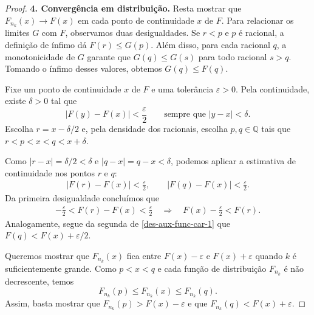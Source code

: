 \documentclass[12pt,portuguese]{article}
\theoremstyle{definition}
\theoremstyle{plainexercise}
\theoremstyle{starredexercise}
\theoremstyle{definition}
\begin{document}
\begin{proof}
\bigskip

\noindent\textbf{4. Convergência em distribuição.}
Resta mostrar que $F_{n_k}(x)\to F(x)$ em cada ponto de continuidade $x$ de
$F$. Para relacionar os limites $G$ com $F$, observamos duas desigualdades.
Se $r<p$ e $p$ é racional, a definição de ínfimo dá $F(r)\leqslant G(p)$.
Além disso, para cada racional $q$, a monotonicidade de $G$ garante que
$G(q)\leqslant G(s)$ para todo racional $s>q$. Tomando o ínfimo desses
valores, obtemos $G(q)\leqslant F(q)$.

Fixe um ponto de continuidade $x$ de $F$ e uma tolerância $\varepsilon>0$.
Pela continuidade, existe $\delta>0$ tal que
\[
|F(y)-F(x)|<\frac{\varepsilon}{2}
\qquad\text{sempre que }|y-x|<\delta.
\]
Escolha $r=x-\delta/2$ e, pela densidade dos racionais, escolha
$p,q\in\mathbb{Q}$ tais que $r<p<x<q<x+\delta$.

\begin{center}
\end{center}
Como $|r-x|=\delta/2<\delta$ e $|q-x|=q-x<\delta$, podemos aplicar a
estimativa de continuidade nos pontos $r$ e $q$:
\begin{align}\label{des-aux-func-car-1}
|F(r)-F(x)|<\frac{\varepsilon}{2},
\qquad
|F(q)-F(x)|<\frac{\varepsilon}{2}.
\end{align}
Da primeira desigualdade concluímos que
\begin{align*}
-\frac{\varepsilon}{2} < F(r)-F(x) <\frac{\varepsilon}{2}
\quad \Longrightarrow \quad
F(x)-\frac{\varepsilon}{2}<F(r).
\end{align*}
Analogamente, segue da segunda de \eqref{des-aux-func-car-1} que
$F(q)<F(x)+\varepsilon/2$.

Queremos mostrar que $F_{n_k}(x)$ fica entre $F(x)-\varepsilon$ e
$F(x)+\varepsilon$ quando $k$ é suficientemente grande. Como $p<x<q$ e
cada função de distribuição $F_{n_k}$ é não decrescente, temos
\[
F_{n_k}(p)\leqslant F_{n_k}(x)\leqslant F_{n_k}(q).
\]
Assim, basta mostrar que $F_{n_k}(p)>F(x)-\varepsilon$ e que
$F_{n_k}(q)<F(x)+\varepsilon$.


\end{proof}
\end{document}
